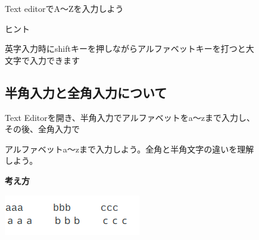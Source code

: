 \documentclass[a4paper,12pt]{jarticle}
\begin{document}
\begin{figure}[ht]
  \flushleft
  \theQuestion\label{Q:hasAnswer02-4}
  Text editorでA〜Zを入力しよう

  ヒント

  英字入力時にshiftキーを押しながらアルファベットキーを打つと大文字で入力できます
\end{figure}
\clearpage
\begin{figure}[ht]
  \subsection{\theExercise 半角入力と全角入力について}
  Text
  Editorを開き、半角入力でアルファベットをa〜zまで入力し、その後、全角入力で

  アルファベットa〜zまで入力しよう。全角と半角文字の違いを理解しよう。

  {\bf\large 考え方}

  \centering
  \includegraphics[width=5.978cm]{textbook-img066.png}

  \begin{minipage}{16.578cm}

    \bigskip


\end{minipage}
\end{figure}
\end{document}
